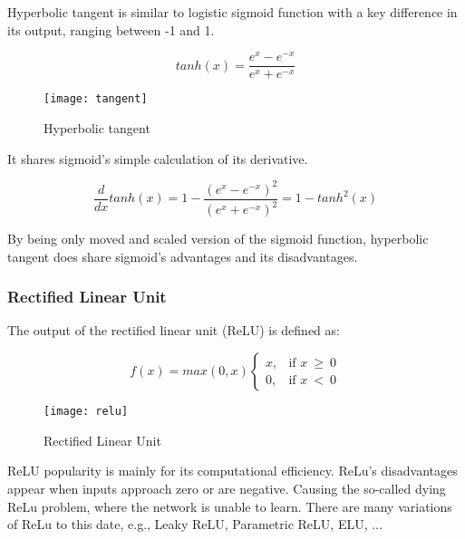Hyperbolic tangent is similar to logistic sigmoid function with a key difference in its output, ranging between -1 and 1.

\begin{equation}
    {tanh(x) = \frac{e^x - e^{-x}}{e^x + e^{-x}}}
\end{equation}


\begin{figure}[h]
	\centering
    \texttt{[image: tangent]}
	\caption{Hyperbolic tangent \cite{matous}}
	\label{fig:hyperbolictangent}
\end{figure}


It shares sigmoid's simple calculation of its derivative.

\begin{equation}
    {\frac{d}{dx}tanh(x) = 1 - \frac{(e^x - e^{-x})^2}{(e^x + e^{-x})^2} = 1 -tanh^2(x)}
\end{equation}

By being only moved and scaled version of the sigmoid function, hyperbolic tangent does share sigmoid's advantages and its disadvantages.\cite{leskovec2020mining}


\subsubsection{Rectified Linear Unit}

The output of the rectified linear unit (ReLU) is defined as:

\begin{equation}
    f(x) = max(0,x)
\begin{cases}
    x, & \text{if $x\ \geq\ 0$}\\
    0, & \text{if $x\ <\ 0$}
\end{cases} 
\end{equation} 

\begin{figure}[h]
	\centering
    \texttt{[image: relu]}
	\caption{Rectified Linear Unit \cite{matous}}
	\label{fig:relu}
\end{figure}


ReLU popularity is mainly for its computational efficiency.\cite{7typesactivationfunctions} ReLu's disadvantages appear when inputs approach zero or are negative. Causing the so-called dying ReLu problem, where the network is unable to learn. There are many variations of ReLu to this date, e.g., Leaky ReLU, Parametric ReLU, ELU, ... 

